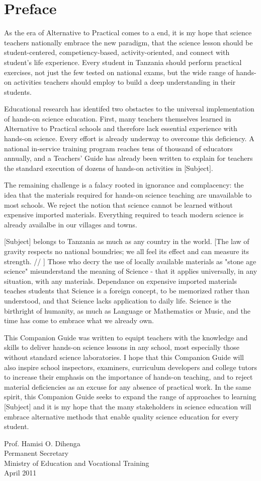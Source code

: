 \chapter*{Preface}

As the era of Alternative to Practical comes to a end, it is my hope 
that science teachers nationally embrace the new paradigm, that the science lesson 
should be student-centered, competiency-based, activity-oriented, and connect 
with student's life experience. Every student in Tanzania should perform practical exercises, not just the few tested on national exams, but the wide range of hands-on activities teachers should employ to build a deep understanding in their students.

Educational research has identifed two obstactes to the universal 
implementation of hands-on science education. First, many teachers themselves learned 
in Alternative to Practical schools and therefore lack essential experience 
with hands-on science. Every effort is already underway to overcome 
this deficiency. A national in-service training program reaches tens of thousand of educators annually, and a Teachers' Guide has already been written to explain for teachers the standard execution of dozens of hands-on activities in [Subject].

The remaining challenge is a falacy rooted in ignorance and complacency: the idea that the materials required for hands-on science teaching are unavailable to most schools. We reject the notion that science cannot be learned without expensive imported materials. Everything required 
to teach modern science is already availalbe in our villages and towns. 

[Subject] belongs to Tanzania as much as any country in the world. [The 
law of gravity respects no national boundries; we all feel its effect 
and can measure its strength. // ] Those who decry the use of locally 
available materials as "stone age science" misunderstand the meaning 
of Science - that it applies universally, in any situation, with any materials. 
Dependance on expensive imported materials teaches students that Science is a foreign 
concept, to be memorized rather than understood, and that Science lacks 
application to daily life. Science is the birthright of humanity, 
as much as Language or Mathematics or Music, and the time has come to 
embrace what we already own.

This Companion Guide was written to equipt teachers with the knowledge and skills to deliver 
hands-on science lessons in any school, most especially those without standard science laboratories. I hope that this Companion Guide will also inspire school inspectors, examiners, curriculum developers and college tutors to increase their emphasis on the importance of hands-on teaching, and to reject material deficiencies as an excuse for any absence of practical work. In the same spirit, this Companion Guide seeks to expand the range of approaches to learning [Subject] and it is my hope that the many stakeholders in science education will embrace alternative methods that enable quality science education for every student.


Prof. Hamisi O. Dihenga\\
Permanent Secretary\\
Ministry of Education and Vocational Training\\
April 2011

